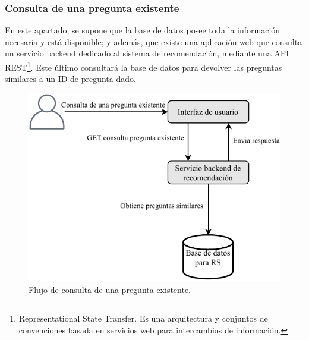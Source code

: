 \subsubsection{Consulta de una pregunta existente}
En este apartado, se supone que la base de datos posee toda la información necesaria y está disponible; y además, que existe una aplicación web que consulta un servicio backend dedicado al sistema de recomendación, mediante una API REST\footnote{Representational State Transfer. Es una arquitectura y conjuntos de convenciones basada en servicios web para intercambios de información.}. Este último consultará la base de datos para devolver las preguntas similares a un ID de pregunta dado.

\begin{figure}[h!]
	\centering
	\includegraphics[width=0.6\linewidth]{8_problema_investigacion/imagenes/implementacion_rs_consulta}
	\caption{Flujo de consulta de una pregunta existente.}
	\label{fig:implementacionrsconsulta}
\end{figure}

